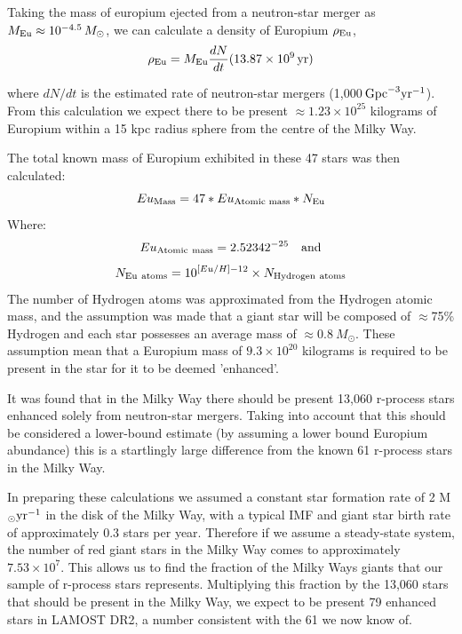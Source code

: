 \documentclass[a4paper,fleqn,usenatbib]{mnras}
\begin{document}
	Taking the mass of europium ejected from a neutron-star merger as $M_{\rm Eu}\approx10^{-4.5}\,M_{\odot}$, we can calculate a density of Europium $\rho_{\rm Eu}$,
\begin{equation}
	\centering
	\rho_{\rm Eu} = M_\textrm{Eu}\frac{dN}{dt}(13.87\times10^9\,{\rm yr})
\end{equation}

\noindent{}where ${dN}/{dt}$ is the estimated rate of neutron-star mergers (1,000$\,{\rm Gpc}^{-3}{\rm yr}^{-1}$). From this calculation we expect there to be present $\approx1.23 \times 10^{25}$ kilograms of Europium within a 15 kpc radius sphere from the centre of the Milky Way.
	
	The total known mass of Europium exhibited in these 47 stars was then calculated:
	\begin{equation}
	Eu_{\rm{Mass}} = 47*Eu_{\textrm{Atomic\,\,mass}}*N_{\textrm{Eu}}
	\end{equation}
	Where:
	\begin{equation}
	Eu_{\rm{Atomic\ mass}} = 2.52342^{-25}  \quad\textrm{and}
	\end{equation}
	\begin{equation}
	N_{\rm{Eu\ atoms}} = 10^{[Eu/H]-12} \times N_{\rm{Hydrogen\ atoms}}
	\end{equation}
	The number of Hydrogen atoms was approximated from the Hydrogen atomic mass, and the assumption was made that a giant star will be composed of $\approx$75\% Hydrogen and each star possesses an average mass of $\approx 0.8\ M_{\odot}$. These assumption mean that a Europium mass of $9.3 \times 10^{20}$ kilograms is required to be present in the star for it to be deemed 'enhanced'.
	
    It was found that in the Milky Way there should be present 13,060 r-process stars enhanced solely from neutron-star mergers. Taking into account that this should be considered a lower-bound estimate (by assuming a lower bound Europium abundance) this is a startlingly large difference from the known 61 r-process stars in the Milky Way.
    
    In preparing these calculations we assumed a constant star formation rate of 2 M$_\odot {\rm yr}^{-1}$ in the disk of the Milky Way, with a typical IMF and giant star birth rate of approximately 0.3 stars per year. Therefore if we assume a steady-state system, the number of red giant stars in the Milky Way comes to approximately $7.53\times10^7$. This allows us to find the fraction of the Milky Ways giants that our sample of r-process stars represents. Multiplying this fraction by the 13,060 stars that should be present in the Milky Way, we expect to be present 79 enhanced stars in LAMOST DR2, a number consistent with the 61 we now know of.
    
\end{document}
